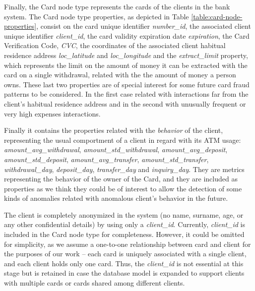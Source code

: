 Finally, the Card node type represents the cards of the clients in the bank system. The Card node type properties, as depicted in Table
\ref{table:card-node-properties}, consist on the card unique 
identifier \emph{number\_id}, the associated client unique identifier \emph{client\_id}, the card validity expiration date \emph{expiration}, the Card Verification Code, \emph{CVC}, the coordinates of the associated client habitual residence address \emph{loc\_latitude} and 
\emph{loc\_longitude} and the \emph{extract\_limit} property, which represents the limit on the amount of money it can be extracted with the card on a single withdrawal, related with the the amount of money a person owns. These last two properties are of special interest for some future card fraud patterns to be considered. In the first case related with interactions far from the client's habitual residence address and in the second with unusually frequent or very high expenses interactions.

Finally it contains the properties related with the \emph{behavior} of the client, representing the usual comportment of a client in regard with its ATM usage: \emph{amount\_avg\_withdrawal}, \emph{amount\_std\_withdrawal}, \emph{amount\_avg\_deposit}, 
\emph{amount\_std\_deposit}, \emph{amount\_avg\_transfer},  \emph{amount\_std\_transfer}, \emph{withdrawal\_day}, \emph{deposit\_day}, \emph{transfer\_day} and \emph{inquiry\_day}.
They are metrics representing the behavior of the owner of the Card, and they are included as properties as we think they could be of interest to allow the detection of some kinds of anomalies related with anomalous client's behavior in the future.



The client is completely anonymized in the system (no name, surname, age, or any other confidential details) by using only a \emph{client\_id}. Currently, \emph{client\_id} is included in the Card node type for completeness. However, it could be omitted for simplicity, as we assume a one-to-one relationship between card and client for the purposes of our work -- each card is uniquely associated with a single client, and each client holds only one card. Thus, the \emph{client\_id} is not essential at this stage but is retained in case the database model is expanded to support clients with multiple cards or cards shared among different clients.

